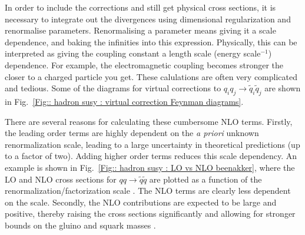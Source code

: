 \documentclass[twoside,english]{uiofysmaster}
\begin{document}
In order to include the corrections and still get physical cross sections, it is necessary to integrate out the divergences using dimensional regularization and renormalise parameters. Renormalising a parameter means giving it a scale dependence, and baking the infinities into this expression. Physically, this can be interpreted as giving the coupling constant a length scale (energy scale$^{-1}$) dependence. For example, the electromagnetic coupling becomes stronger the closer to a charged particle you get. These calulations are often very complicated and tedious. Some of the diagrams for virtual corrections to $q_iq_j \rightarrow \tilde{q}_i \tilde{q}_j$ are shown in Fig.~\ref{Fig:: hadron susy : virtual correction Feynman diagrams}.

There are several reasons for calculating these cumbersome NLO terms. Firstly, the leading order terms are highly dependent on the \textit{a priori} unknown renormalization scale, leading to a large uncertainty in theoretical predictions (up to a factor of two). Adding higher order terms reduces this scale dependency. An example is shown in Fig.~\ref{Fig:: hadron susy : LO vs NLO beenakker}, where the LO and NLO cross sections for $qq \rightarrow \tilde{q} \tilde{q}$ are plotted as a function of the renormalization/factorization scale \cite{beenakker1997squark}. The NLO terms are clearly less dependent on the scale.  Secondly, the NLO contributions are expected to be large and positive, thereby raising the cross sections significantly and allowing for stronger bounds on the gluino and squark masses \cite{beenakker1997squark}.
\end{document}
